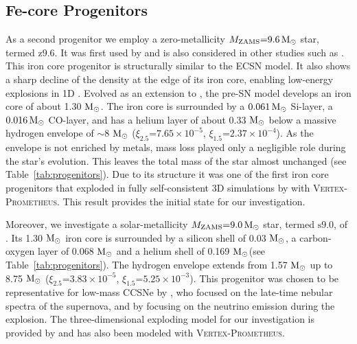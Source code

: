 \documentclass[fleqn,usenatbib]{mnras}
\newcommand{\solm}{\ensuremath{\rm{M_{\odot}}}\xspace}
\newcommand{\vertexprom}{\textsc{Vertex-Prometheus}\xspace}
\newcommand{\snine}{\ensuremath{\mathrm{s9.0}}\xspace}
\newcommand{\znine}{\ensuremath{\mathrm{z9.6}}\xspace}
\begin{document}
\subsection{Fe-core Progenitors}
As a second progenitor we employ a zero-metallicity 
$M_{\text{ZAMS}}\mathord{=}9.6\,\solm$ star, termed \znine. 
It was first used by \citet{Janka2012} and is also considered in other 
studies such as \citet{Mueller2013,Mueller2018}. This iron core 
progenitor is structurally similar to the ECSN model. It also shows a 
sharp decline of the density at the edge of its iron core, enabling low-energy 
explosions in 1D \citep{Melson2015}. 
Evolved as an extension to \cite{Heger2010}, the pre-SN model develops an 
iron core of about 1.30 \solm. The iron core is surrounded by a $0.061\,\solm$ 
Si-layer, a $0.016\,\solm$ CO-layer, and has a helium layer of about 0.33
\solm below a massive hydrogen envelope of $\mathord{\sim}8$ \solm 
($\xi_{2.5}\mathord{=}7.65 \times 10^{-5}$, $\xi_{1.5}\mathord{=}2.37 \times 10^{-4}$).
As the envelope is not enriched by metals, mass loss played only a negligible 
role during the star's evolution. This leaves the total mass of the star 
almost unchanged (see Table~\ref{tab:progenitors}). 
Due to its structure it was one of the first iron core progenitors that exploded 
in fully self-consistent 3D simulations by \cite{Melson2015a} with \vertexprom. 
This result provides the initial state for our investigation. 

Moreover, we investigate a solar-metallicity $M_{\text{ZAMS}} \mathord{=} 9.0 \,\solm$ 
star, termed \snine, of \citet{Sukhbold2016}. Its 1.30 \solm iron core is 
surrounded by a silicon shell of 0.03 \solm, a carbon-oxygen layer of 0.068 
\solm and a helium shell of 0.169 \solm (see Table~\ref{tab:progenitors}). 
The hydrogen envelope extends from 1.57 \solm up to 8.75 \solm 
($\xi_{2.5}\mathord{=}3.83 \times 10^{-5}$, $\xi_{1.5}\mathord{=}5.25 \times 10^{-3}$).
This progenitor was chosen to be representative for low-mass CCSNe 
by \cite{Jerkstrand2018}, who focused on the late-time nebular spectra 
of the supernova, and by \cite{Glas2019} focusing on the neutrino 
emission during the explosion. The three-dimensional exploding model for 
our investigation is provided by \citet{Melson2019} and has also been 
modeled with \vertexprom. 
\end{document}
